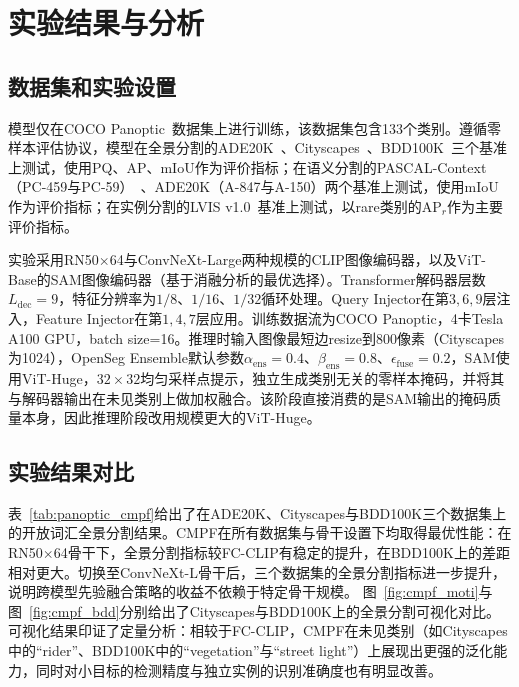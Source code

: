 \section{实验结果与分析}

\subsection{数据集和实验设置}

模型仅在COCO Panoptic~\cite{lin2014microsoft}数据集上进行训练，该数据集包含133个类别。遵循零样本评估协议，模型在全景分割的ADE20K~\cite{zhou2017scene}、Cityscapes~\cite{cordts2016cityscapes}、BDD100K~\cite{yu2020bdd100k}三个基准上测试，使用PQ、AP、mIoU作为评价指标；在语义分割的PASCAL-Context（PC-459与PC-59）~\cite{mottaghi2014role}、ADE20K（A-847与A-150）两个基准上测试，使用mIoU作为评价指标；在实例分割的LVIS v1.0~\cite{gupta2019lvis}基准上测试，以rare类别的$\mathrm{AP}_r$作为主要评价指标。

实验采用RN50$\times$64与ConvNeXt-Large两种规模的CLIP图像编码器，以及ViT-Base的SAM图像编码器（基于消融分析的最优选择）。Transformer解码器层数$L_{\text{dec}}=9$，特征分辨率为$1/8$、$1/16$、$1/32$循环处理。Query Injector在第$3,6,9$层注入，Feature Injector在第$1,4,7$层应用。训练数据流为COCO Panoptic，4卡Tesla A100 GPU，batch size=16。推理时输入图像最短边resize到800像素（Cityscapes为1024），OpenSeg Ensemble默认参数$\alpha_{\text{ens}}=0.4$、$\beta_{\text{ens}}=0.8$、$\epsilon_{\text{fuse}}=0.2$，SAM使用ViT-Huge，$32\times 32$均匀采样点提示，独立生成类别无关的零样本掩码，并将其与解码器输出在未见类别上做加权融合。该阶段直接消费的是SAM输出的掩码质量本身，因此推理阶段改用规模更大的ViT-Huge。


\subsection{实验结果对比}

表~\ref{tab:panoptic_cmpf}给出了在ADE20K、Cityscapes与BDD100K三个数据集上的开放词汇全景分割结果。CMPF在所有数据集与骨干设置下均取得最优性能：在RN50$\times$64骨干下，全景分割指标较FC-CLIP有稳定的提升，在BDD100K上的差距相对更大。切换至ConvNeXt-L骨干后，三个数据集的全景分割指标进一步提升，说明跨模型先验融合策略的收益不依赖于特定骨干规模。
图~\ref{fig:cmpf_moti}与图~\ref{fig:cmpf_bdd}分别给出了Cityscapes与BDD100K上的全景分割可视化对比。可视化结果印证了定量分析：相较于FC-CLIP，CMPF在未见类别（如Cityscapes中的“rider”、BDD100K中的“vegetation”与“street light”）上展现出更强的泛化能力，同时对小目标的检测精度与独立实例的识别准确度也有明显改善。

